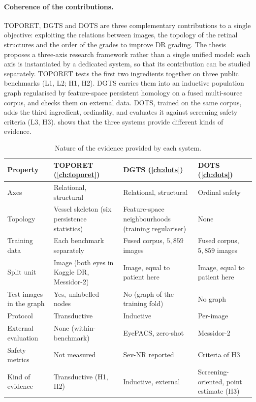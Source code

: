 \paragraph{Coherence of the contributions.}
TOPORET, DGTS and DOTS are three complementary contributions to a single objective:
exploiting the relations between images, the topology of the retinal structures and the
order of the grades to improve DR grading. The thesis proposes a three-axis research
framework rather than a single unified model: each axis is instantiated by a dedicated
system, so that its contribution can be studied separately. TOPORET tests the first two
ingredients together on three public benchmarks (L1, L2; H1, H2). DGTS carries them into
an inductive population graph regularised by feature-space persistent homology on a fused
multi-source corpus, and checks them on external data. DOTS, trained on the same corpus,
adds the third ingredient, ordinality, and evaluates it against screening safety criteria
(L3, H3).  shows that the three systems provide different kinds of
evidence.

\begin{table}[H]
\centering
\caption[Nature of the evidence provided by each system]{Nature of the evidence provided
by each system.}
\label{tab:evidence}
\small
\begin{tabular}{@{}P{3.3cm}P{3.9cm}P{3.6cm}P{3.6cm}@{}}
\toprule
Property & TOPORET (\cref{ch:toporet}) & DGTS (\cref{ch:dots}) & DOTS (\cref{ch:dots}) \\
\midrule
Axes & Relational, structural & Relational, structural & Ordinal safety \\
Topology & Vessel skeleton (six persistence statistics) & Feature-space neighbourhoods (training regulariser) & None \\
Training data & Each benchmark separately & Fused corpus, $5{,}859$ images & Fused corpus, $5{,}859$ images \\
Split unit & Image (both eyes in Kaggle DR, Messidor-2) & Image, equal to patient here & Image, equal to patient here \\
Test images in the graph & Yes, unlabelled nodes & No (graph of the training fold) & No graph \\
Protocol & Transductive & Inductive & Per-image \\
External evaluation & None (within-benchmark) & EyePACS, zero-shot & Messidor-2 \\
Safety metrics & Not measured & Sev-NR reported & Criteria of H3 \\
Kind of evidence & Transductive (H1, H2) & Inductive, external & Screening-oriented, point estimate (H3) \\
\bottomrule
\end{tabular}
\end{table}

